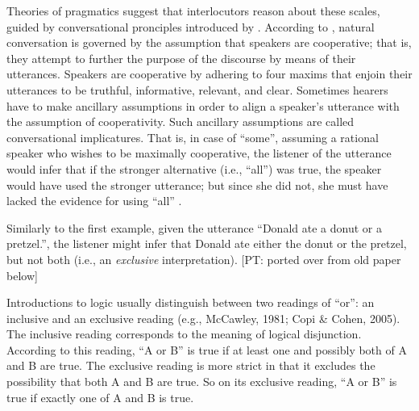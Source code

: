 \documentclass{sp}
\newcommand{\pt}[1]{\textcolor{Cerulean}{[PT: #1]}}
\begin{document}
Theories of pragmatics suggest that interlocutors reason about these scales, guided by conversational pronciples introduced by \citet{grice1975logic}.
According to \citet{grice1975logic}, natural conversation is governed by
the assumption that speakers are cooperative; that is, they attempt to further the purpose
of the discourse by means of their utterances. Speakers are cooperative by adhering
to four maxims that enjoin their utterances to be truthful, informative, relevant,
and clear. Sometimes hearers have to make ancillary assumptions in order to align a
speaker’s utterance with the assumption of cooperativity. Such ancillary assumptions
are called conversational implicatures.
That is, in case of ``some'', assuming a rational speaker who wishes to be maximally cooperative, the listener of the utterance would infer that if the stronger alternative (i.e., ``all'') was true, the speaker would have used the stronger utterance; but since she did not, she must have lacked the evidence for using ``all'' \citep{grice1975logic, goodman2016pragmatic}.

Similarly to the first example, given the utterance “Donald ate a donut or a pretzel.”, the listener might infer that Donald ate either the donut or the pretzel, but not both (i.e., an \textit{exclusive} interpretation).
\pt{ported over from old paper below}
 
Introductions to logic usually distinguish between two readings of “or”: an inclusive
and an exclusive reading (e.g., McCawley, 1981; Copi \& Cohen, 2005). The inclusive
reading corresponds to the meaning of logical disjunction. According to this reading,
“A or B” is true if at least one and possibly both of A and B are true. The exclusive
reading is more strict in that it excludes the possibility that both A and B are true. So
on its exclusive reading, “A or B” is true if exactly one of A and B is true. 
\end{document}
